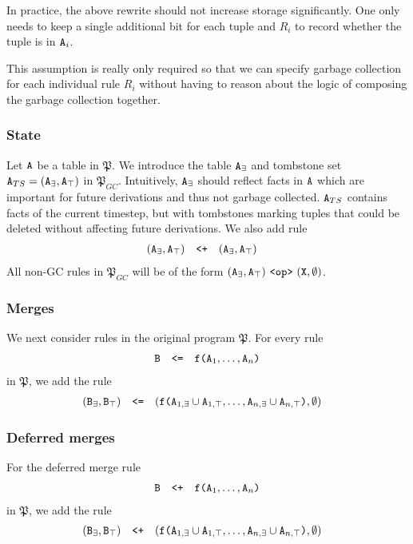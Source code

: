 \documentclass{article}
\numberwithin{equation}{section}
\renewcommand{\tt}[1]{\ifmmode\text{\texttt{#1}}\else\texttt{#1}\fi}
\begin{document}
In practice, the above rewrite should not increase storage significantly.
One only needs to keep a single additional bit for each tuple and $R_i$ to record whether the tuple is in $\tt{A}_i$.

This assumption is really only required so that we can specify garbage collection for each individual rule $R_i$ without having to reason about the logic of composing the garbage collection together.

\subsubsection{State}
Let $\tt{A}$ be a table in $\mathfrak{P}$.
We introduce the table $\tt{A}_\exists$ and tombstone set $\tt{A}_{TS} = (\tt{A}_\exists, \tt{A}_\top)$ in $\mathfrak{P}_{GC}$.
Intuitively, $\tt{A}_\exists$ should reflect facts in $\tt{A}$ which are important for future derivations and thus not garbage collected.
$\tt{A}_{TS}$ contains facts of the current timestep, but with tombstones marking tuples that could be deleted without affecting future derivations.
We also add rule
\begin{align}
(\tt{A}_\exists, \tt{A}_\top) &\quad\tt{<+}\quad (\tt{A}_\exists, \tt{A}_\top)\label{eq:aexistmerge}
\end{align}
All non-GC rules in $\mathfrak{P}_{GC}$ will be of the form $(\tt{A}_\exists, \tt{A}_\top) ~\tt{<op>}~ (\tt{X}, \emptyset)$.


\subsubsection{Merges}
We next consider rules in the original program $\mathfrak{P}$.
For every rule
\begin{align}
\tt{B} \quad\tt{<=}\quad \tt{f(}\tt{A}_1,\dots,\tt{A}_n\tt{)}
\end{align}
in $\mathfrak{P}$, we add the rule
\begin{align*}
(\tt{B}_\exists, \tt{B}_\top) &\quad\tt{<=}\quad (\tt{f(}\tt{A}_{1,\exists} \cup \tt{A}_{1,\top},\dots,\tt{A}_{n,\exists} \cup \tt{A}_{n,\top}\tt{)}, \emptyset)
\end{align*}

\subsubsection{Deferred merges}
For the deferred merge rule
\begin{align}
\tt{B} \quad\tt{<+}\quad \tt{f(}\tt{A}_1,\dots,\tt{A}_n\tt{)}
\end{align}
in $\mathfrak{P}$, we add the rule
\begin{align*}
(\tt{B}_\exists, \tt{B}_\top) &\quad\tt{<+}\quad (\tt{f(}\tt{A}_{1,\exists} \cup \tt{A}_{1,\top},\dots,\tt{A}_{n,\exists} \cup \tt{A}_{n,\top}\tt{)}, \emptyset)
\end{align*}
\end{document}
